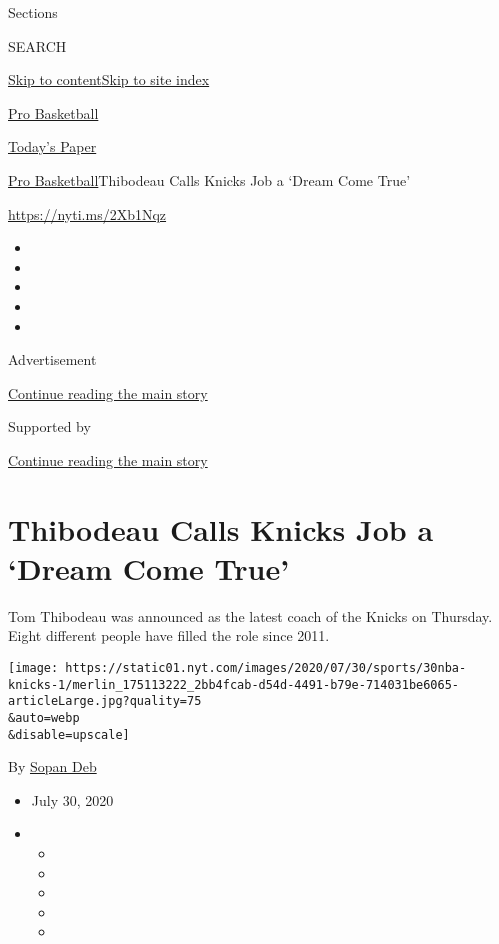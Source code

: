 Sections

SEARCH

\protect\hyperlink{site-content}{Skip to
content}\protect\hyperlink{site-index}{Skip to site index}

\href{https://www.nytimes.com/section/sports/basketball}{Pro Basketball}

\href{https://myaccount.nytimes.com/auth/login?response_type=cookie\&client_id=vi}{}

\href{https://www.nytimes.com/section/todayspaper}{Today's Paper}

\href{/section/sports/basketball}{Pro Basketball}\textbar{}Thibodeau
Calls Knicks Job a `Dream Come True'

\url{https://nyti.ms/2Xb1Nqz}

\begin{itemize}
\item
\item
\item
\item
\item
\end{itemize}

Advertisement

\protect\hyperlink{after-top}{Continue reading the main story}

Supported by

\protect\hyperlink{after-sponsor}{Continue reading the main story}

\hypertarget{thibodeau-calls-knicks-job-a-dream-come-true}{%
\section{Thibodeau Calls Knicks Job a `Dream Come
True'}\label{thibodeau-calls-knicks-job-a-dream-come-true}}

Tom Thibodeau was announced as the latest coach of the Knicks on
Thursday. Eight different people have filled the role since 2011.

\texttt{[image: https://static01.nyt.com/images/2020/07/30/sports/30nba-knicks-1/merlin\_175113222\_2bb4fcab-d54d-4491-b79e-714031be6065-articleLarge.jpg?quality=75\\\&auto=webp\\\&disable=upscale]}

By \href{https://www.nytimes.com/by/sopan-deb}{Sopan Deb}

\begin{itemize}
\item
  July 30, 2020
\item
  \begin{itemize}
  \item
  \item
  \item
  \item
  \item
  \end{itemize}
\end{itemize}

